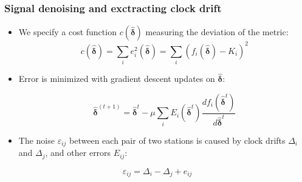 \documentclass{beamer}
\begin{document}
\begin{frame}
\frametitle{Signal denoising and exctracting clock drift}
\begin{itemize}
\item We specify a cost function $c(\bm{\hat{\delta}})$ measuring the deviation of the metric:
\begin{equation}
c(\bm{\hat{\delta}}) = \sum_i e_i^2(\bm{\hat{\delta}}) = \sum_i(f_i(\bm{\hat{\delta}})-K_i)^2
\end{equation}

\item Error is minimized with gradient descent updates on $\bm{\hat{\delta}}$: 

\begin{equation}
\bm{\hat{\delta}}^{(t+1)} = \bm{\hat{\delta}}^t-\mu\sum_i E_i(\bm{\hat{\delta}}^t)\frac{df_i(\bm{\hat{\delta}}^t)}{d\bm{\hat{\delta}}^t}
\label{eq:updates}
\end{equation}

\item The noise $\varepsilon_{ij}$ between each pair of two stations is caused by clock drifts $\Delta_i$ and $\Delta_j$, and other errors $E_{ij}$:
\end{itemize}
\begin{equation}
\varepsilon_{ij} = \Delta_i - \Delta_j + e_{ij}
\end{equation}

\end{frame}
\end{document}
